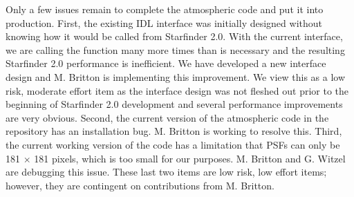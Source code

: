 Only a few issues remain to complete the atmospheric code and put it into production. First, the existing IDL interface was initially designed without knowing how it would be called from Starfinder 2.0. With the current interface, we are calling the function many more times than is necessary and the resulting Starfinder 2.0 performance is inefficient. We have developed a new interface design and M. Britton is implementing this improvement. We view this as a low risk, moderate effort item as the interface design was not fleshed out prior to the beginning of Starfinder 2.0 development and several performance improvements are very obvious. Second, the current version of the atmospheric code in the repository has an installation bug. M. Britton is working to resolve this. Third, the current working version of the code has a limitation that PSFs can only be 181 $\times$ 181 pixels, which is too small for our purposes. M. Britton and G. Witzel are debugging this issue. These last two items are low risk, low effort items; however, they are contingent on contributions from M. Britton.


  